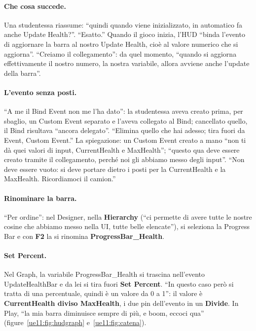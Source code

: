 \paragraph{Che cosa succede.} Una studentessa riassume: ``quindi quando viene
inizializzato, in automatico fa anche Update Health?''. ``Esatto.'' Quando il gioco
inizia, l'HUD ``binda l'evento di aggiornare la barra al nostro Update Health, cioè al
valore numerico che si aggiorna''. ``Creiamo il collegamento'': da quel momento, ``quando si
aggiorna effettivamente il nostro numero, la nostra variabile, allora avviene anche
l'update della barra''.

\paragraph{L'evento senza posti.} ``A me il Bind Event non me l'ha dato'': la studentessa
aveva creato prima, per sbaglio, un Custom Event separato e l'aveva collegato al Bind;
cancellato quello, il Bind risultava ``ancora delegato''. ``Elimina quello che hai
adesso; tira fuori da Event, Custom Event.'' La spiegazione: un Custom Event creato a mano
``non ti dà quei valori di input, CurrentHealth e MaxHealth''; ``questo qua deve essere
creato tramite il collegamento, perché noi gli abbiamo messo degli input''. ``Non deve
essere vuoto: si deve portare dietro i posti per la CurrentHealth e la MaxHealth.
Ricordiamoci il camion.''

\paragraph{Rinominare la barra.} ``Per ordine'': nel Designer, nella \textbf{Hierarchy}
(``ci permette di avere tutte le nostre cosine che abbiamo messo nella UI, tutte belle
elencate''), si seleziona la Progress Bar e con \textbf{F2} la si rinomina
\textbf{ProgressBar\_Health}.

\paragraph{Set Percent.} Nel Graph, la variabile ProgressBar\_Health si trascina
nell'evento UpdateHealthBar e da lei si tira fuori \textbf{Set Percent}. ``In questo caso
però si tratta di una percentuale, quindi è un valore da 0 a 1'': il valore è
\textbf{CurrentHealth diviso MaxHealth}, i due pin dell'evento in un \textbf{Divide}. In
Play, ``la mia barra diminuisce sempre di più, e boom, eccoci qua''
(figure~\ref{ue11:fig:hudgraph} e~\ref{ue11:fig:catena}).

